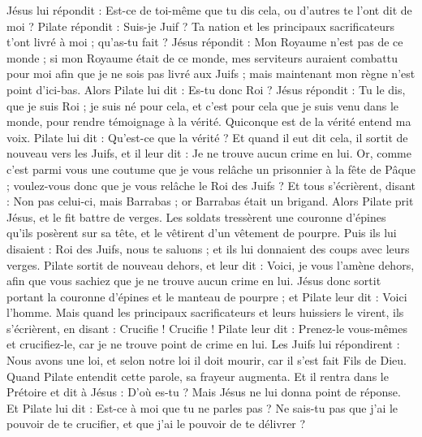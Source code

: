 \begin{multicols}{2}
Jésus lui répondit : Est-ce de toi-même que tu dis cela, ou d'autres te l'ont dit de moi ?
Pilate répondit : Suis-je Juif ? Ta nation et les principaux sacrificateurs t'ont livré à moi ; qu'as-tu fait ?
Jésus répondit : Mon Royaume n'est pas de ce monde ; si mon Royaume était de ce monde, mes serviteurs auraient combattu pour moi afin que je ne sois pas livré aux Juifs ; mais maintenant mon règne n'est point d'ici-bas.
Alors Pilate lui dit : Es-tu donc Roi ? Jésus répondit : Tu le dis, que je suis Roi ; je suis né pour cela, et c'est pour cela que je suis venu dans le monde, pour rendre témoignage à la vérité. Quiconque est de la vérité entend ma voix.
Pilate lui dit : Qu'est-ce que la vérité ? Et quand il eut dit cela, il sortit de nouveau vers les Juifs, et il leur dit : Je ne trouve aucun crime en lui.
Or, comme c'est parmi vous une coutume que je vous relâche un prisonnier à la fête de Pâque ; voulez-vous donc que je vous relâche le Roi des Juifs ?
Et tous s'écrièrent, disant : Non pas celui-ci, mais Barrabas ; or Barrabas était un brigand.
\VerseOne{}Alors Pilate prit Jésus, et le fit battre de verges.
Les soldats tressèrent une couronne d'épines qu'ils posèrent sur sa tête, et le vêtirent d'un vêtement de pourpre.
Puis ils lui disaient : Roi des Juifs, nous te saluons ; et ils lui donnaient des coups avec leurs verges.
Pilate sortit de nouveau dehors, et leur dit : Voici, je vous l'amène dehors, afin que vous sachiez que je ne trouve aucun crime en lui.
Jésus donc sortit portant la couronne d'épines et le manteau de pourpre ; et Pilate leur dit : Voici l'homme.
Mais quand les principaux sacrificateurs et leurs huissiers le virent, ils s'écrièrent, en disant : Crucifie ! Crucifie ! Pilate leur dit : Prenez-le vous-mêmes et crucifiez-le, car je ne trouve point de crime en lui.
Les Juifs lui répondirent : Nous avons une loi, et selon notre loi il doit mourir, car il s'est fait Fils de Dieu.
Quand Pilate entendit cette parole, sa frayeur augmenta.
Et il rentra dans le Prétoire et dit à Jésus : D'où es-tu ? Mais Jésus ne lui donna point de réponse.
Et Pilate lui dit : Est-ce à moi que tu ne parles pas ? Ne sais-tu pas que j'ai le pouvoir de te crucifier, et que j'ai le pouvoir de te délivrer ?

\end{multicols}
